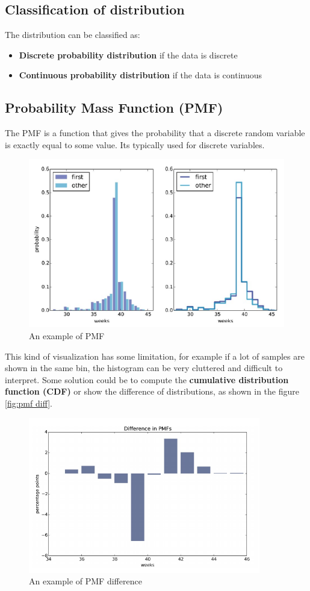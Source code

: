 \subsection{Classification of distribution}
The distribution can be classified as:
\begin{itemize}
  \item \textbf{Discrete probability distribution} if the data is discrete
  \item \textbf{Continuous probability distribution} if the data is continuous
\end{itemize}
\subsection{Probability Mass Function (PMF)}
The PMF is a function that gives the probability that a discrete random
variable is exactly equal to some value. Its typically used for discrete
variables.
\begin{figure}[H]
  \centering
  \includegraphics[scale=.60]{images/DataExplVis/pmf.png}
  \caption{An example of PMF}
  \label{fig:pmf}
\end{figure}
This kind of visualization has some limitation, for example if a lot
of samples are shown in the same bin, the histogram can be very
cluttered and difficult to interpret. Some solution could be to
compute the \textbf{cumulative distribution function (CDF)} or show
the difference of distributions, as shown in the figure \ref{fig:pmf
diff}.
\begin{figure}[H]
  \centering
  \includegraphics[scale=.70]{images/DataExplVis/pmf diff.png}
  \caption{An example of PMF difference}
  \label{fig:pmf diff}
\end{figure}

